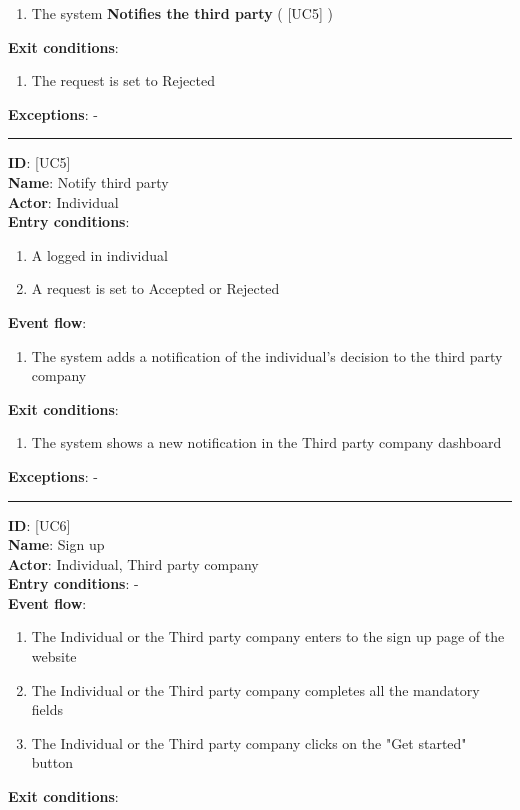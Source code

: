 \documentclass[12pt]{report}
\newcommand\usecase[1]{ [UC#1] }
\begin{document}
\begin{itemize}
\begin{enumerate}
    			\item{The system \textbf{Notifies the third party} (\usecase{5})}
  		\end{enumerate}
  	\textbf{Exit conditions}:
  		\begin{enumerate}
			\item{The request is set to Rejected}
  		\end{enumerate}
  	\textbf{Exceptions}: - \\
  	\rule{\linewidth}{0.4pt}
  	\textbf{ID}: \usecase{5} \\
  	\textbf{Name}: Notify third party \\
    \textbf{Actor}: Individual \\
    \textbf{Entry conditions}: 
    		\begin{enumerate}
			\item{A logged in individual}
    			\item{A request is set to Accepted or Rejected}
  		\end{enumerate}
  	\textbf{Event flow}:
  		\begin{enumerate}
    			\item{The system adds a notification of the individual's decision to the third party company}
  		\end{enumerate}
  	\textbf{Exit conditions}:
  		\begin{enumerate}
    			\item{The system shows a new notification in the Third party company dashboard}
  		\end{enumerate}
  	\textbf{Exceptions}: - \\
  	\rule{\linewidth}{0.4pt}
  	\textbf{ID}: \usecase{6} \\
  	\textbf{Name}: Sign up \\
    \textbf{Actor}: Individual, Third party company \\
    \textbf{Entry conditions}: - \\
  	\textbf{Event flow}:
  		\begin{enumerate}
    			\item{The Individual or the Third party company enters to the sign up page of the website}
    			\item{The Individual or the Third party company completes all the mandatory fields}
    			\item{The Individual or the Third party company clicks on the "Get started" button}
  		\end{enumerate}
  	\textbf{Exit conditions}:
  		\begin{enumerate}

\end{enumerate}
\end{itemize}
\end{document}
